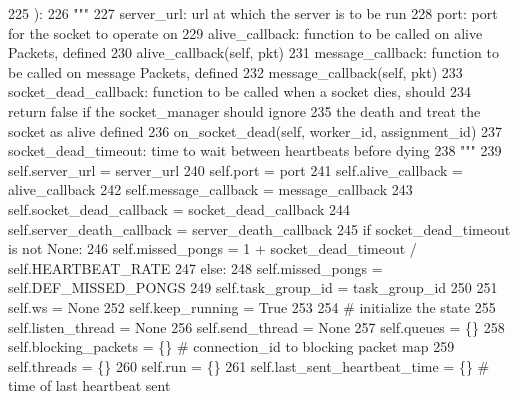 \begin{DoxyCode}
225     ):
226         \textcolor{stringliteral}{"""}
227 \textcolor{stringliteral}{        server\_url:           url at which the server is to be run}
228 \textcolor{stringliteral}{        port:                 port for the socket to operate on}
229 \textcolor{stringliteral}{        alive\_callback:       function to be called on alive Packets, defined}
230 \textcolor{stringliteral}{                               alive\_callback(self, pkt)}
231 \textcolor{stringliteral}{        message\_callback:     function to be called on message Packets, defined}
232 \textcolor{stringliteral}{                               message\_callback(self, pkt)}
233 \textcolor{stringliteral}{        socket\_dead\_callback: function to be called when a socket dies, should}
234 \textcolor{stringliteral}{                              return false if the socket\_manager should ignore}
235 \textcolor{stringliteral}{                              the death and treat the socket as alive defined}
236 \textcolor{stringliteral}{                               on\_socket\_dead(self, worker\_id, assignment\_id)}
237 \textcolor{stringliteral}{        socket\_dead\_timeout:  time to wait between heartbeats before dying}
238 \textcolor{stringliteral}{        """}
239         self.server\_url = server\_url
240         self.port = port
241         self.alive\_callback = alive\_callback
242         self.message\_callback = message\_callback
243         self.socket\_dead\_callback = socket\_dead\_callback
244         self.server\_death\_callback = server\_death\_callback
245         \textcolor{keywordflow}{if} socket\_dead\_timeout \textcolor{keywordflow}{is} \textcolor{keywordflow}{not} \textcolor{keywordtype}{None}:
246             self.missed\_pongs = 1 + socket\_dead\_timeout / self.HEARTBEAT\_RATE
247         \textcolor{keywordflow}{else}:
248             self.missed\_pongs = self.DEF\_MISSED\_PONGS
249         self.task\_group\_id = task\_group\_id
250 
251         self.ws = \textcolor{keywordtype}{None}
252         self.keep\_running = \textcolor{keyword}{True}
253 
254         \textcolor{comment}{# initialize the state}
255         self.listen\_thread = \textcolor{keywordtype}{None}
256         self.send\_thread = \textcolor{keywordtype}{None}
257         self.queues = \{\}
258         self.blocking\_packets = \{\}  \textcolor{comment}{# connection\_id to blocking packet map}
259         self.threads = \{\}
260         self.run = \{\}
261         self.last\_sent\_heartbeat\_time = \{\}  \textcolor{comment}{# time of last heartbeat sent}

\end{DoxyCode}
